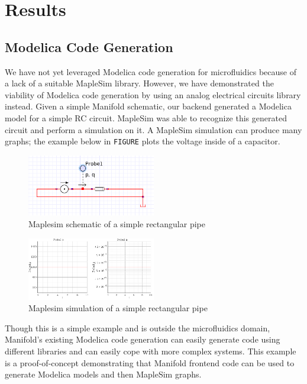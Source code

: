 \section{Results}

\subsection{Modelica Code Generation}

We have not yet leveraged Modelica code generation for microfluidics because of a lack of a suitable MapleSim library.
However, we have demonstrated the viability of Modelica code generation by using an analog electrical circuits library instead.
Given a simple Manifold schematic, our backend generated a Modelica model for a simple RC circuit.
MapleSim was able to recognize this generated circuit and perform a simulation on it.
A MapleSim simulation can produce many graphs; the example below in {\tt FIGURE} plots the voltage inside of a capacitor.

\begin{figure}[ht]
  \caption{Maplesim schematic of a simple rectangular pipe}
  \centering
    \includegraphics[width=0.5\textwidth]{img/simple-pipe.png}
\end{figure}
\begin{figure}[ht]
  \caption{Maplesim simulation of a simple rectangular pipe}
  \centering
    \includegraphics[width=0.5\textwidth]{img/simple-pipe-simulation.png}
\end{figure}


Though this is a simple example and is outside the microfluidics domain, Manifold's existing Modelica code generation can easily generate code using different libraries and can easily cope with more complex systems.
This example is a proof-of-concept demonstrating that Manifold frontend code can be used to generate Modelica models and then MapleSim graphs.

